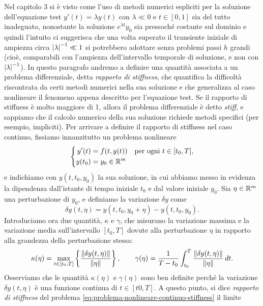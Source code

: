 Nel capitolo 3 si è visto come l'uso di metodi numerici espliciti per la soluzione
dell'equazione test $y'(t) = \lambda y(t)$ con $\lambda \ll 0$ e $t \in [0,1]$
sia del tutto inadeguato, nonostante la soluzione $e^{\lambda t} y_0$
sia pressoché costante sul dominio e quindi l'intuito ci suggerisca
che una volta superato il transiente iniziale di ampiezza circa
$\left\lvert\lambda\right\rvert^{-1} \ll 1$ si potrebbero adottare senza problemi passi $h$ grandi
(cioè, comparabili con l'ampiezza dell'intervallo temporale di soluzione,
e non con $\left\lvert\lambda\right\rvert^{-1}$).
In questo paragrafo andremo a definire una quantità associata a un problema
differenziale, detta \emph{rapporto di stiffness}, che quantifica la difficoltà
riscontrata da certi metodi numerici nella sua soluzione e che generalizza al
caso nonlineare il fenomeno appena descritto per l'equazione test.
Se il rapporto di stiffness è molto maggiore di 1, allora il problema
differenziale è detto \emph{stiff}, e sappiamo che il calcolo numerico della
sua soluzione richiede metodi specifici (per esempio, impliciti).
Per arrivare a definire il rapporto di stiffness nel caso continuo, fissiamo
innanzitutto un problema nonlineare
\begin{equation} \label{eq:problema-nonlineare-continuo-stiffness}
\left\{
\begin{aligned}
y'(t)  &= f(t,y(t)) \quad \text{per ogni $t \in [t_0,T]$}, \\
y(t_0) &= y_0 \in \mathbb{R}^m
\end{aligned}
\right.
\end{equation}
e indichiamo con $y(t,t_0,y_0)$ la sua soluzione, in cui abbiamo messo in evidenza
la dipendenza dall'istante di tempo iniziale $t_0$ e dal valore iniziale $y_0$.
Sia $\eta \in \mathbb{R}^m$ una perturbazione di $y_0$, e definiamo la variazione
$\delta y$ come
\[
\delta y(t,\eta) = y(t,t_0,y_0+\eta) - y(t,t_0,y_0).
\]
Introduciamo ora due quantità, $\kappa$ e $\gamma$, che misurano la variazione
massima e la variazione media sull'intervallo $[t_0,T]$ dovute alla
perturbazione $\eta$ in rapporto alla grandezza della perturbazione stessa:
\[
\kappa(\eta) = \max_{t \in [t_0,T]} \left\lbrace
	\frac{\left\lVert\delta y(t,\eta)\right\rVert}{\left\lVert\eta\right\rVert} \right\rbrace,
\qquad \gamma(\eta) = \frac{1}{T-t_0} \int_{t_0}^T
	\frac{\left\lVert\delta y(t,\eta)\right\rVert}{\left\lVert\eta\right\rVert} \, dt.
\]
Osserviamo che le quantità $\kappa(\eta)$ e $\gamma(\eta)$ sono ben definite
perché la variazione $\delta y(t,\eta)$ è una funzione continua di $t \in [t0,T]$.
A questo punto, si dice \emph{rapporto di stiffness} del problema
\eqref{eq:problema-nonlineare-continuo-stiffness} il limite
